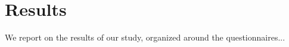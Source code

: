 \section{Results}
\label{results}

We report on the results of our study, organized around the questionnaires...


